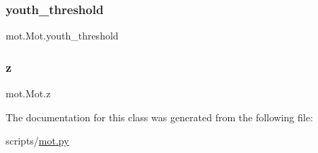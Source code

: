 \subsubsection{\texorpdfstring{youth\+\_\+threshold}{youth\_threshold}}
{\footnotesize\ttfamily mot.\+Mot.\+youth\+\_\+threshold}

\mbox{\label{classmot_1_1Mot_a5c825a78182ddd5d999a5f873cc54191}} 
\subsubsection{\texorpdfstring{z}{z}}
{\footnotesize\ttfamily mot.\+Mot.\+z\hspace{0.3cm}{\ttfamily [static]}}



The documentation for this class was generated from the following file\+:\begin{DoxyCompactItemize}
\item 
scripts/\hyperlink{mot_8py}{mot.\+py}\end{DoxyCompactItemize}
